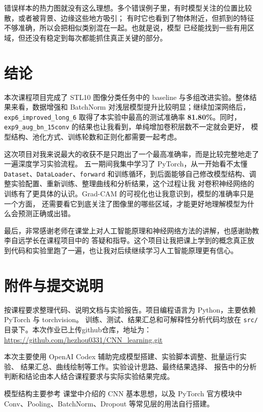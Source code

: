 \documentclass[UTF8]{ctexart}
\begin{document}
错误样本的热力图就没有这么理想。多个错误例子里，有时模型关注的位置比较散，或者被背景、边缘这些地方吸引；
有时它也看到了物体附近，但抓到的特征不够准确，所以会把相似类别混在一起。也就是说，模型
已经能找到一些有用区域，但还没有稳定到每次都能抓住真正关键的部分。



\section{结论}
本次课程项目完成了 STL10 图像分类任务中的 baseline 与多组改进实验。整体结果来看，数据增强和 BatchNorm
对浅层模型提升比较明显；继续加深网络后，\texttt{exp6\_improved\_long\_6} 取得了本实验中最高的测试准确率
\textbf{81.80\%}。同时，\texttt{exp9\_aug\_bn\_15conv} 的结果也让我看到，单纯增加卷积层数不一定就会更好，
模型结构、池化方式、训练轮数和正则化都需要一起考虑。

这次项目对我来说最大的收获不是只跑出了一个最高准确率，而是比较完整地走了一遍深度学习实验流程。
五一期间我集中学习了 PyTorch，从一开始看不太懂 \texttt{Dataset}、\texttt{DataLoader}、\texttt{forward}
和训练循环，到后面能够自己修改模型结构、调整实验配置、重新训练、整理曲线和分析结果，这个过程让我
对卷积神经网络的训练有了更具体的认识。Grad-CAM 的可视化也让我意识到，模型的准确率只是一个方面，
还需要看它到底关注了图像里的哪些区域，才能更好地理解模型为什么会预测正确或出错。

最后，非常感谢老师在课堂上对人工智能原理和神经网络方法的讲解，也感谢助教李自远学长在课程项目中的
答疑和指导。这个项目让我把课上学到的概念真正放到代码和实验里跑了一遍，也让我对后续继续学习人工智能原理更有信心。

\section*{附件与提交说明}
按课程要求整理代码、说明文档与实验报告。项目编程语言为 Python，主要依赖 PyTorch 与 torchvision。
训练、测试、结果汇总和可解释性分析代码均放在 \texttt{src/} 目录下。本次作业已上传github仓库，地址为：\url{https://github.com/hezhou0331/CNN_learning.git}

本次主要使用 OpenAI Codex 辅助完成模型搭建、实验脚本调整、批量运行实验、
结果汇总、曲线绘制等工作。实验设计思路、最终结果选择、
报告中的分析判断和结论由本人结合课程要求与实际实验结果完成。

模型结构主要参考
课堂中介绍的 CNN 基本思想，以及 PyTorch 官方模块中 Conv、Pooling、BatchNorm、Dropout 等常见层的用法自行搭建。
\end{document}
